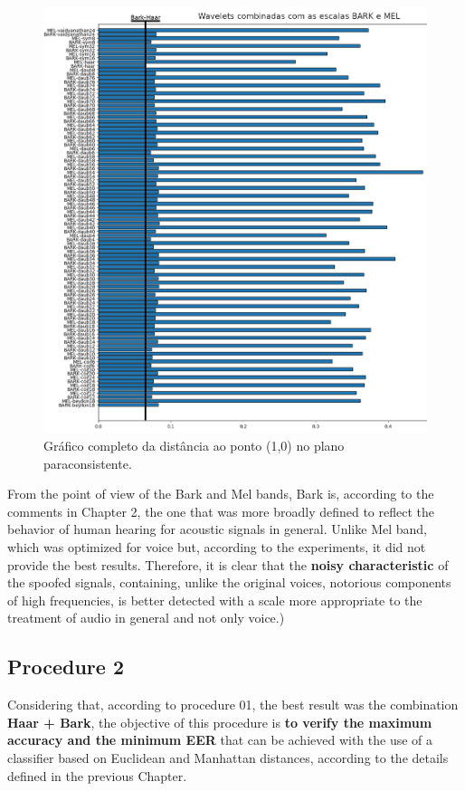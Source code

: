 		
		
		\clearpage
		\begin{figure}[H]
			\centering
			\includegraphics[width=0.99\linewidth]{images/results/paraconsistentPlane/ParaconsistentFull.png}
			\caption{Gráfico completo da distância ao ponto (1,0) no plano paraconsistente.}
			\label{fig:paraconsistentfull}
		\end{figure}
		
		\par From the point of view of the Bark and Mel bands, Bark is, according to the comments in Chapter 2, the one that was more broadly defined to reflect the behavior of human hearing for acoustic signals in general. Unlike Mel band, which was optimized for voice but, according to the experiments, it did not provide the best results. Therefore, it is clear that the \textbf{noisy characteristic} of the spoofed signals, containing, unlike the original voices, notorious components of high frequencies, is better detected with a scale more appropriate to the treatment of audio in general and not only voice.)
		
		
	\subsection{Procedure 2} 
		\label{sec:testsResults:subsec:Experimento02}
		\par Considering that, according to procedure 01, the best result was the combination \textbf{Haar + Bark}, the objective of this procedure is \textbf{to verify the maximum accuracy and the minimum EER} that can be achieved with the use of a classifier based on Euclidean and Manhattan distances, according to the details defined in the previous Chapter.\\
		

